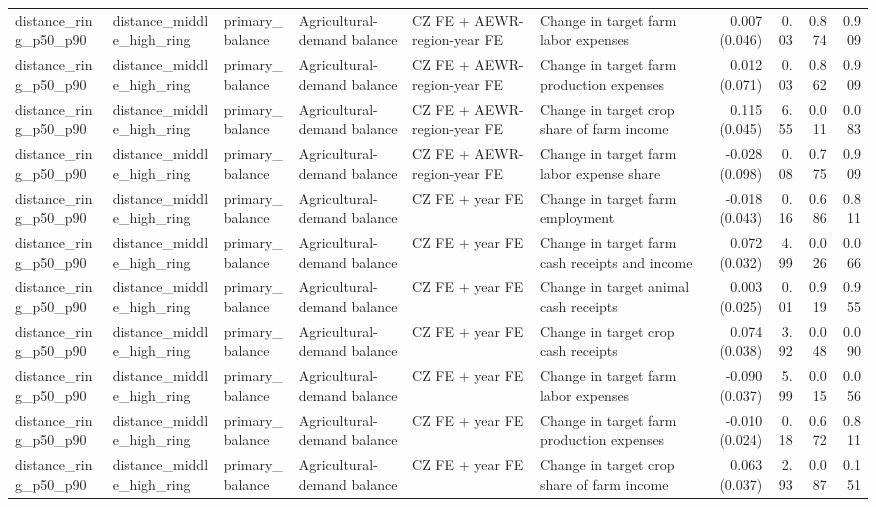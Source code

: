 \begin{tabular}{llllllrrrr}
distance_ring_p50_p90 & distance_middle_high_ring & primary_balance & Agricultural-demand balance & CZ FE + AEWR-region-year FE & Change in target farm labor expenses & 0.007 (0.046) & 0.03 & 0.874 & 0.909 \\
distance_ring_p50_p90 & distance_middle_high_ring & primary_balance & Agricultural-demand balance & CZ FE + AEWR-region-year FE & Change in target farm production expenses & 0.012 (0.071) & 0.03 & 0.862 & 0.909 \\
distance_ring_p50_p90 & distance_middle_high_ring & primary_balance & Agricultural-demand balance & CZ FE + AEWR-region-year FE & Change in target crop share of farm income & 0.115 (0.045) & 6.55 & 0.011 & 0.083 \\
distance_ring_p50_p90 & distance_middle_high_ring & primary_balance & Agricultural-demand balance & CZ FE + AEWR-region-year FE & Change in target farm labor expense share & -0.028 (0.098) & 0.08 & 0.775 & 0.909 \\
distance_ring_p50_p90 & distance_middle_high_ring & primary_balance & Agricultural-demand balance & CZ FE + year FE & Change in target farm employment & -0.018 (0.043) & 0.16 & 0.686 & 0.811 \\
distance_ring_p50_p90 & distance_middle_high_ring & primary_balance & Agricultural-demand balance & CZ FE + year FE & Change in target farm cash receipts and income & 0.072 (0.032) & 4.99 & 0.026 & 0.066 \\
distance_ring_p50_p90 & distance_middle_high_ring & primary_balance & Agricultural-demand balance & CZ FE + year FE & Change in target animal cash receipts & 0.003 (0.025) & 0.01 & 0.919 & 0.955 \\
distance_ring_p50_p90 & distance_middle_high_ring & primary_balance & Agricultural-demand balance & CZ FE + year FE & Change in target crop cash receipts & 0.074 (0.038) & 3.92 & 0.048 & 0.090 \\
distance_ring_p50_p90 & distance_middle_high_ring & primary_balance & Agricultural-demand balance & CZ FE + year FE & Change in target farm labor expenses & -0.090 (0.037) & 5.99 & 0.015 & 0.056 \\
distance_ring_p50_p90 & distance_middle_high_ring & primary_balance & Agricultural-demand balance & CZ FE + year FE & Change in target farm production expenses & -0.010 (0.024) & 0.18 & 0.672 & 0.811 \\
distance_ring_p50_p90 & distance_middle_high_ring & primary_balance & Agricultural-demand balance & CZ FE + year FE & Change in target crop share of farm income & 0.063 (0.037) & 2.93 & 0.087 & 0.151 \\

\end{tabular}
